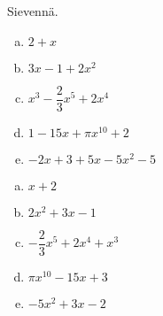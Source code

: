 \begin{tehtava}
	Sievennä.
	\begin{enumerate}[a)]
		\item $2 + x$
		\item $3x - 1 + 2x^2$
		\item $x^3 - \dfrac{2}{3}x^5 + 2x^4 $
		\item $1 - 15x + \pi x^{10} + 2$
		\item $-2x + 3 + 5x - 5x^2 - 5$
	\end{enumerate}

	\begin{vastaus}
		\begin{enumerate}[a)]
			\item $x + 2$
			\item $2x^2 + 3x - 1$
			\item $-\dfrac{2}{3}x^5 + 2x^4 + x^3 $
			\item $\pi x^10 - 15x + 3$
			\item $-5x^2 + 3x - 2$
		\end{enumerate}
	\end{vastaus}
\end{tehtava}
